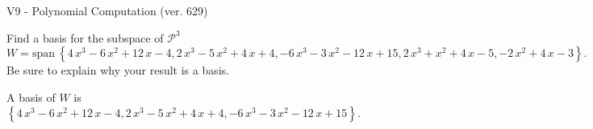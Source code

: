 \begin{exercise}
  \begin{exerciseTitle}V9 - Polynomial Computation (ver. 629)\end{exerciseTitle}
  \begin{exerciseStatement}
    Find a basis for the subspace of \(\mathcal{P}^3\) 
\[W=\mathrm{span}\ \left\{4 \, x^{3} - 6 \, x^{2} + 12 \, x - 4 , 2 \, x^{3} - 5 \, x^{2} + 4 \, x + 4 , -6 \, x^{3} - 3 \, x^{2} - 12 \, x + 15 , 2 \, x^{3} + x^{2} + 4 \, x - 5 , -2 \, x^{2} + 4 \, x - 3\right\}.\]
 Be sure to explain why your result is a basis.


  \end{exerciseStatement}
  \begin{exerciseAnswer}
   A basis of \(W\) is  \(\left\{4 \, x^{3} - 6 \, x^{2} + 12 \, x - 4 , 2 \, x^{3} - 5 \, x^{2} + 4 \, x + 4 , -6 \, x^{3} - 3 \, x^{2} - 12 \, x + 15\right\}\).
  


  \end{exerciseAnswer}
\end{exercise}
